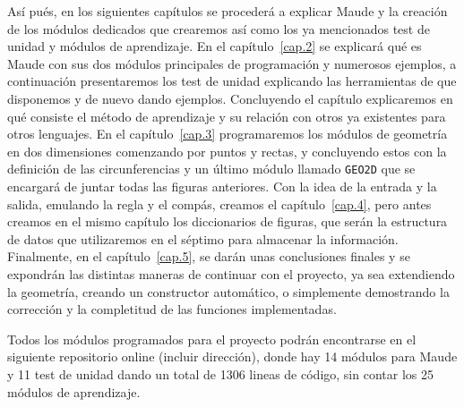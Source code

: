 Así pués, en los siguientes capítulos se procederá a explicar Maude y la creación de los módulos dedicados que crearemos así como los ya mencionados test de unidad y módulos de aprendizaje. En el capítulo~\ref{cap.2} se explicará qué es Maude con sus dos módulos principales de programación y numerosos ejemplos, a continuación presentaremos los test de unidad explicando las herramientas de que disponemos y de nuevo dando ejemplos. Concluyendo el capítulo explicaremos en qué consiste el método de aprendizaje y su relación con otros ya existentes para otros lenguajes. En el capítulo~\ref{cap.3} programaremos los módulos de geometría en dos dimensiones comenzando por puntos y rectas, y concluyendo estos con la definición de las circunferencias y un último módulo llamado \texttt{GEO2D} que se encargará de juntar todas las figuras anteriores. Con la idea de la entrada y la salida, emulando la regla y el compás, creamos el capítulo~\ref{cap.4}, pero antes creamos en el mismo capítulo los diccionarios de figuras, que serán la estructura de datos que utilizaremos en el séptimo para almacenar la información. Finalmente, en el capítulo~\ref{cap.5}, se darán unas conclusiones finales y se expondrán las distintas maneras de continuar con el proyecto, ya sea extendiendo la geometría, creando un constructor automático, o simplemente demostrando la corrección y la completitud de las funciones implementadas.\par

Todos los módulos programados para el proyecto podrán encontrarse en el siguiente repositorio online (incluir dirección), donde hay 14 módulos para Maude y 11 test de unidad dando un total de 1306 lineas de código, sin contar los 25 módulos de aprendizaje. %

